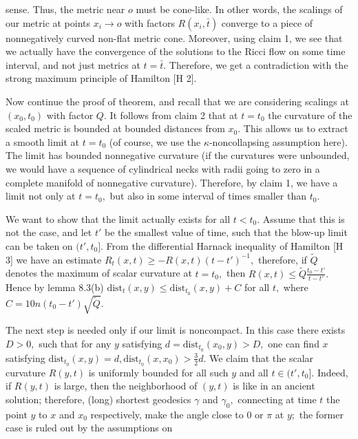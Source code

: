 \documentclass[12pt]{article}
\newcommand{\bt}{\bar{t}}
\theoremstyle{plain}
{\swapnumbers
\newtheorem{thm}{Theorem}[section]
\newtheorem{cor}[thm]{Corollary}
\newtheorem{lem}[thm]{Lemma}
\newtheorem{prop}[thm]{Proposition}
}
\theoremstyle{definition}
{\swapnumbers
\newtheorem{defn}[thm]{Definition}
\newtheorem{nota}[thm]{Notation}
\newtheorem{parag}[thm]{}
\newtheorem*{parstr}{\addtocounter{thm}{1}\thesection.\arabic{thm}*}
\newtheorem*{intropar}{\addtocounter{thm}{1}\arabic{thm}}
}
\theoremstyle{remark} {\swapnumbers
\newtheorem{rem}[thm]{Remark}
\newtheorem{exam}[thm]{Example}
\newtheorem{lemma}[thm]{Lemma}
\newtheorem{claim}[thm]{Claim}
}
\numberwithin{equation}{section}
\begin{document}
    sense. Thus, the metric near $o$ must be cone-like. In other
    words, the scalings of our metric at points $x_i\to o$ with
    factors $R(x_i,\bt)$ converge to a piece of nonnegatively
    curved non-flat metric cone. Moreover, using claim 1, we see
    that we actually have the convergence of the solutions to the
    Ricci flow on some time interval, and not just metrics at
    $t=\bt.$ Therefore, we get a contradiction with the strong
    maximum principle of Hamilton [H 2].
    \par Now continue the proof of theorem, and recall that we are
    considering scalings at $(x_0,t_0)$ with factor $Q.$ It
    follows from claim 2 that at $t=t_0$ the curvature of the
    scaled metric is bounded at bounded distances from $x_0.$
    This allows us to extract a smooth limit at $t=t_0$ (of
    course, we use the $\kappa$-noncollapsing assumption here). The
    limit has bounded nonnegative curvature (if the curvatures
    were unbounded, we would have a sequence of cylindrical necks
    with radii going to zero in a complete manifold of nonnegative
    curvature). Therefore, by claim 1, we have a limit not only at
    $t=t_0,$ but also in some interval of times smaller than
    $t_0.$ \par We want to show that the limit actually exists for all
    $t<t_0.$ Assume that this is not the case, and let $t'$ be the
    smallest value of time, such that the blow-up limit can be
    taken on $(t',t_0].$ From the differential Harnack inequality
    of Hamilton [H 3] we have an estimate $R_t(x,t)\ge
    -R(x,t)(t-t')^{-1},$ therefore, if $\tilde{Q}$ denotes the
    maximum of scalar curvature at $t=t_0,$ then $R(x,t)\le
    \tilde{Q}\frac{t_0-t'}{t-t'}.$ Hence by lemma 8.3(b)
    $\mbox{dist}_t(x,y)\le \mbox{dist}_{t_0}(x,y)+C$ for all $t,$
    where $C=10n(t_0-t')\sqrt{\tilde{Q}}.$
    \par The next step is needed only if our limit is noncompact.
    In this case there exists $D>0,$ such that for any $y$
    satisfying $d=\mbox{dist}_{t_0}(x_0,y)>D,$ one can find $x$
    satisfying $\mbox{dist}_{t_0}(x,y)=d,
    \mbox{dist}_{t_0}(x,x_0)>\frac{3}{2}d.$ We claim that the
    scalar curvature $R(y,t)$ is uniformly bounded for all such
    $y$ and all $t\in (t',t_0].$ Indeed, if $R(y,t)$ is large,
    then the neighborhood of $(y,t)$ is like in an ancient
    solution; therefore, (long) shortest geodesics $\gamma$ and
    $\gamma_0,$ connecting at time $t$ the point $y$ to $x$ and
    $x_0$ respectively, make the angle close to $0$ or $\pi$ at
    $y;$ the former case is ruled out by the assumptions on
\end{document}
